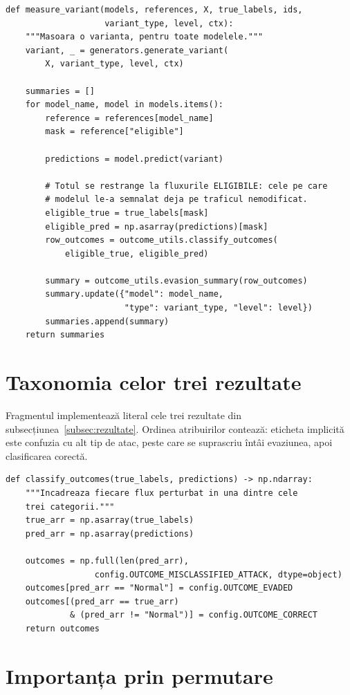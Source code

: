 \begin{verbatim}
def measure_variant(models, references, X, true_labels, ids,
                    variant_type, level, ctx):
    """Masoara o varianta, pentru toate modelele."""
    variant, _ = generators.generate_variant(
        X, variant_type, level, ctx)

    summaries = []
    for model_name, model in models.items():
        reference = references[model_name]
        mask = reference["eligible"]

        predictions = model.predict(variant)

        # Totul se restrange la fluxurile ELIGIBILE: cele pe care
        # modelul le-a semnalat deja pe traficul nemodificat.
        eligible_true = true_labels[mask]
        eligible_pred = np.asarray(predictions)[mask]
        row_outcomes = outcome_utils.classify_outcomes(
            eligible_true, eligible_pred)

        summary = outcome_utils.evasion_summary(row_outcomes)
        summary.update({"model": model_name,
                        "type": variant_type, "level": level})
        summaries.append(summary)
    return summaries
\end{verbatim}


\section{Taxonomia celor trei rezultate}\label{sec:anexa-outcomes}

Fragmentul implementează literal cele trei rezultate din subsecțiunea~\ref{subsec:rezultate}. Ordinea atribuirilor contează: eticheta implicită este confuzia cu alt tip de atac, peste care se suprascriu întâi evaziunea, apoi clasificarea corectă.

\begin{verbatim}
def classify_outcomes(true_labels, predictions) -> np.ndarray:
    """Incadreaza fiecare flux perturbat in una dintre cele
    trei categorii."""
    true_arr = np.asarray(true_labels)
    pred_arr = np.asarray(predictions)

    outcomes = np.full(len(pred_arr),
                  config.OUTCOME_MISCLASSIFIED_ATTACK, dtype=object)
    outcomes[pred_arr == "Normal"] = config.OUTCOME_EVADED
    outcomes[(pred_arr == true_arr)
             & (pred_arr != "Normal")] = config.OUTCOME_CORRECT
    return outcomes
\end{verbatim}

\section{Importanța prin permutare}\label{sec:anexa-importanta-cod}

